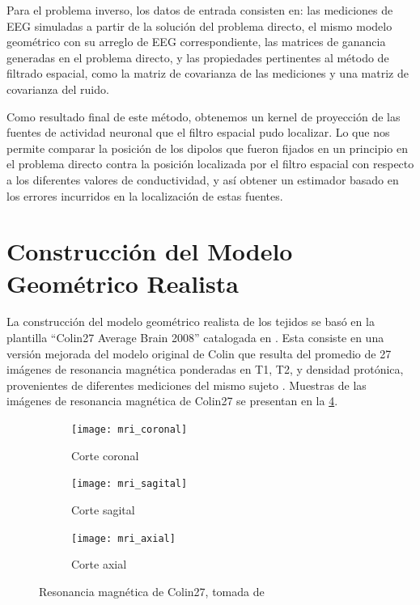 Para el problema inverso, los datos de entrada consisten en: las mediciones de EEG simuladas a partir de la solución del problema directo, el mismo modelo geométrico con su arreglo de EEG correspondiente, las matrices de ganancia generadas en el problema directo, y las propiedades pertinentes al método de filtrado espacial, como la matriz de covarianza de las mediciones y una matriz de covarianza del ruido.

Como resultado final de este método, obtenemos un kernel de proyección de las fuentes de actividad neuronal que el filtro espacial pudo localizar.
Lo que nos permite comparar la posición de los dipolos que fueron fijados en un principio en el problema directo contra la posición localizada por el filtro espacial con respecto a los diferentes valores de conductividad, y así obtener un estimador basado en los errores incurridos en la localización de estas fuentes.

\section{Construcción del Modelo Geométrico Realista}
\label{sec:methodology:model}

La construcción del modelo geométrico realista de los tejidos se basó en la plantilla ``Colin27 Average Brain 2008'' catalogada en \cite{Aubert-Broche2006}.
Esta consiste en una versión mejorada del modelo original de Colin que resulta del promedio de 27 imágenes de resonancia magnética ponderadas en T1, T2, y densidad protónica, provenientes de diferentes mediciones del mismo sujeto \cite{Collins1998, Holmes1998}.
Muestras de las imágenes de resonancia magnética de Colin27 se presentan en la \cref{fig:methodology:mri}.

\begin{figure}[tb]
	\centering
	\begin{subfigure}{0.49\textwidth}
		\centering
		\texttt{[image: mri\_coronal]}
		\caption{Corte coronal}
		\label{fig:methodology:coronal}
		\vspace{0.1cm} %
	\end{subfigure}
	\begin{subfigure}{0.49\textwidth}
		\centering
		\texttt{[image: mri\_sagital]}
		\caption{Corte sagital}
		\label{fig:methodology:sagital}
		\vspace{0.1cm} %
	\end{subfigure}
	\begin{subfigure}{0.49\textwidth}
		\centering
		\texttt{[image: mri\_axial]}
		\caption{Corte axial}
		\label{fig:methodology:axial}
	\end{subfigure}
	\caption{Resonancia magnética de Colin27, tomada de \cite{Aubert-Broche2006}}
	\label{fig:methodology:mri}
\end{figure}

